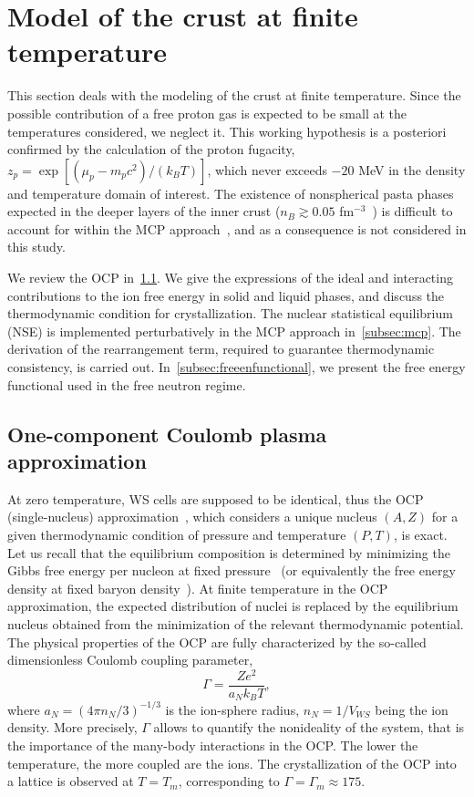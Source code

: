 \minitoc\newpage

\section{Model of the crust at finite temperature}\label{sec:modelcrusttemp}

This section deals with the modeling of the crust at finite temperature. 
Since the possible contribution of a free proton gas is expected to be small at 
the temperatures considered, we neglect it. This working hypothesis 
is a posteriori confirmed by the calculation of the proton fugacity, 
$z_p = \exp[(\mu_p-m_pc^2)/(k_B T)]$, which never exceeds $-20$ MeV in 
the density and temperature domain of interest. 
The existence of nonspherical pasta phases expected in the deeper layers of the 
inner crust ($n_B \gtrsim 0.05$ fm$^{-3}$~\cite{Pearson2020}) is difficult to 
account for within the MCP approach~\cite{Barros2020}, and 
as a consequence is not considered in this study.

We review the OCP in~\ref{subsec:ocp}. 
We give the expressions of the ideal and interacting
contributions to the ion free energy in solid and liquid phases, and discuss 
the thermodynamic condition for crystallization. The nuclear statistical
equilibrium (NSE) is implemented perturbatively in the MCP approach 
in~\ref{subsec:mcp}. The derivation of the rearrangement term, 
required to guarantee thermodynamic consistency, is carried out.
In~\ref{subsec:freeenfunctional}, we present the free energy functional used in
the free neutron regime.

\subsection{One-component Coulomb plasma approximation}\label{subsec:ocp}

At zero temperature, WS cells are supposed to be identical, thus the OCP  
(single-nucleus) approximation~\cite{Baus1980}, which considers a unique 
nucleus $(A,Z)$ for a given thermodynamic condition of pressure and temperature 
$(P,T)$, is exact. Let us recall that the equilibrium composition is 
determined by minimizing the Gibbs free energy per nucleon at fixed
pressure~\cite{Fantina2020} 
(or equivalently the free energy density at fixed baryon
density~\cite{Lattimer1991,Gulminelli2015,Carreau2019}).
At finite temperature in the OCP approximation, the expected distribution of 
nuclei is replaced by the equilibrium nucleus obtained from the minimization of 
the relevant thermodynamic potential.
The physical properties of the OCP are fully characterized by the so-called 
dimensionless Coulomb coupling parameter,
%
\begin{equation}
  \Gamma = \frac{Ze^2}{a_N k_B T},\label{eq:gamma}
\end{equation}
%
where $a_N=(4\pi n_N/3)^{-1/3}$ is the ion-sphere radius, $n_N=1/V_{WS}$ being 
the ion density.
More precisely, $\Gamma$ allows to quantify the nonideality of the system, that
is the importance of the many-body interactions in the OCP. The lower the
temperature, the more coupled are the ions. The crystallization of the OCP into 
a lattice is observed at $T=T_m$, corresponding to 
$\Gamma = \Gamma_m \approx 175$.

